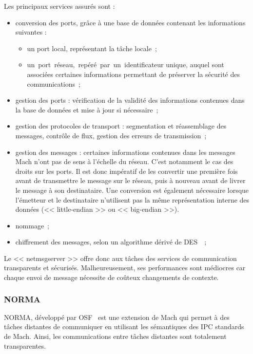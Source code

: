 Les principaux services assur\'es sont :
\begin{itemize}
\item conversion des ports, gr\^ace \`a une base de donn\'ees contenant les 
informations suivantes :
\begin{itemize}
\item un port local, repr\'esentant la t\^ache locale~;
\item un~port~r\'eseau,~rep\'er\'e~par~un~identificateur unique, auquel sont
associ\'ees certaines infor\-mations permettant de pr\'eserver la s\'ecurit\'e
des communications~;
\end {itemize}
\item gestion des ports : v\'erification de la validit\'e des 
informations contenues dans la base de donn\'ees et mise \`a jour 
si n\'ecessaire~;
\item gestion des protocoles de transport : segmentation et r\'eassemblage des 
messages, contr\^ole de flux, gestion des erreurs de transmission~; 
\item gestion des messages : certaines informations contenues dans les messages 
Mach n'ont pas de sens \`a l'\'echelle du r\'eseau. C'est notamment le cas
des droits sur les ports. Il est donc imp\'eratif de les convertir
une premi\`ere fois avant de transmettre le message sur le r\'eseau, puis 
\`a nouveau avant de livrer le message \`a son destinataire. Une conversion est \'egalement n\'ecessaire lorsque l'\'emetteur et le destinataire n'utilisent pas
la m\^eme repr\'esentation interne des donn\'ees (<< little-endian >> ou << big-endian >>).
\item nommage~;
\item chiffrement des messages, selon un algorithme d\'eriv\'e de DES~\cite{des77}~;
\end {itemize}

Le << netmsgserver >> offre donc aux t\^aches des services de communication 
transparents et s\'ecuris\'es. Malheureusement, ses performances sont 
m\'ediocres car chaque envoi de message n\'ecessite de co\^uteux changements 
de contexte.

\subsubsection{NORMA}

NORMA, d\'evelopp\'e par OSF~\cite{norma93,norma94} est une extension de Mach 
qui permet \`a des t\^aches distantes de communiquer en utilisant les 
s\'emantiques des IPC standards de Mach. Ainsi, les communications entre 
t\^aches distantes sont totalement transparentes.

